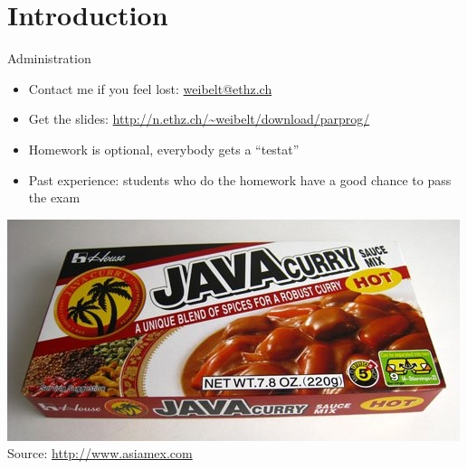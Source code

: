 \note{
}


\section*{Introduction}

\begin{frame}{Administration}
  \begin{itemize}
  \item Contact me if you feel lost: \url{weibelt@ethz.ch}
  \item Get the slides:
    \url{http://n.ethz.ch/~weibelt/download/parprog/}
  \item Homework is optional, everybody gets a ``testat''
  \item Past experience: students who do the homework have a good
    chance to pass the exam
  \end{itemize}


  \begin{center}
    \includegraphics[scale=0.6]{figures/java} \\
    \tiny{Source: \url{http://www.asiamex.com}}
  \end{center}
\end{frame}

